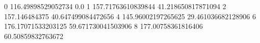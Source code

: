 0 116.49898529052734 0.0
1 157.71763610839844 41.218650817871094
2 157.146484375 40.647499084472656
4 145.96002197265625 29.461036682128906
6 176.17071533203125 59.671730041503906
8 177.00758361816406 60.50859832763672
